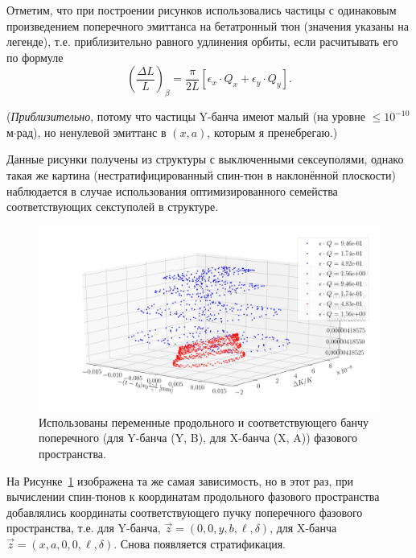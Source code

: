 \documentclass{article}
\begin{document}
Отметим, что при построении рисунков использовались частицы с одинаковым произведением поперечного эмиттанса на
бетатронный тюн (значения указаны на легенде), т.е. приблизительно равного удлинения орбиты,
если расчитывать его по формуле
\[
\left(\frac{\Delta L}{L}\right)_\beta = \frac{\pi}{2L}[\epsilon_x\cdot Q_x + \epsilon_y\cdot Q_y].
\]

(\emph{Приблизительно}, потому что частицы Y-банча имеют малый (на уровне $\le10^{-10}$ м$\cdot$рад), но ненулевой
эмиттанс в $(x,a)$, которым я пренебрегаю.)

Данные рисунки получены из структуры с выключенными сексеуполями, однако такая же картина (нестратифицированный
спин-тюн в наклонённой плоскости) наблюдается в случае использования оптимизированного семейства соответствующих
секступолей в структуре.

\begin{figure}[h]
  \centering
  \includegraphics[height=.3\paperheight]{../../img/STUNE_TRAJ_TEST/3D_plot_long_+_trans_ps(for_bunch)}
  \caption{Использованы переменные продольного и соответствующего банчу поперечного (для Y-банча (Y, B),
    для X-банча (X, A)) фазового пространства.\label{fig:secondary}}
\end{figure}

На Рисунке~\ref{fig:secondary} изображена та же самая зависимость, но в этот раз, при вычислении спин-тюнов
к координатам продольного фазового пространства добавлялись координаты соответствующего пучку поперечного
фазового пространства, т.е. для Y-банча, $\vec z = (0, 0, y, b, \ell, \delta)$,
для X-банча $\vec z = (x, a, 0, 0, \ell, \delta)$. Снова появляется стратификация.
\end{document}
